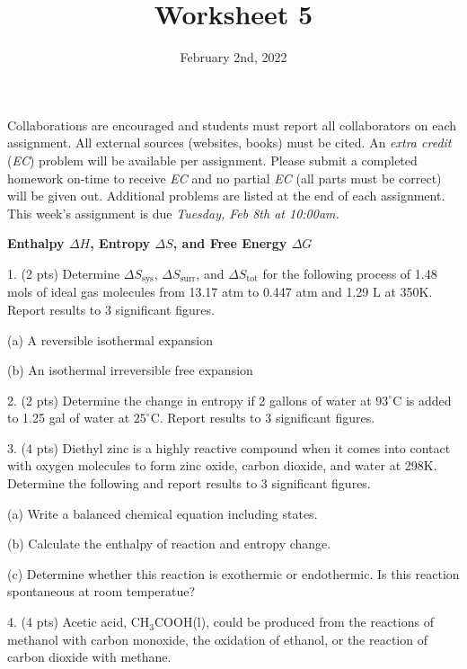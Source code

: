 \documentclass[11pt]{article}
\title{\textbf{Worksheet 5}}
\date{\vspace{-2em}February 2nd, 2022}
\begin{document}
\maketitle

Collaborations are encouraged and students must report all collaborators
on each assignment. All external sources (websites, books) must be
cited. An \textit{extra credit} (\textit{EC}) problem will be available per
assignment. Please submit a completed homework on-time to receive \textit{EC}
and no partial \textit{EC} (all parts must be correct) will be given out.
Additional problems are listed at the end of each assignment. This week's
assignment is due \textit{Tuesday, Feb 8th at 10:00am.}

\textbf{Enthalpy $\Delta H$, Entropy $\Delta S$, and Free Energy $\Delta G$}

1. (2 pts) Determine $\Delta S_\text{sys}$, $\Delta S_\text{surr}$, and $\Delta S_\text{tot}$ for the
following process of 1.48 mols of ideal gas molecules from 13.17 atm to 0.447 atm
and 1.29 L at 350K. Report results to 3 significant figures.

(a) A reversible isothermal expansion

(b) An isothermal irreversible free expansion

\vspace{2.5in}

2. (2 pts) Determine the change in entropy if 2 gallons of water at $93^\circ\text{C}$ is added to
1.25 gal of water at $25^\circ\text{C}$. Report results to 3 significant figures.

\vspace{2.5in}

3. (4 pts) Diethyl zinc is a highly reactive compound when it comes into contact with oxygen molecules
to form zinc oxide, carbon dioxide, and water at 298K. Determine the following and report results
to 3 significant figures.

(a) Write a balanced chemical equation including states.

(b) Calculate the enthalpy of reaction and entropy change.

(c) Determine whether this reaction is exothermic or endothermic. Is this reaction spontaneous
at room temperatue?

\vspace{2.5in}

4. (4 pts) Acetic acid, CH$_3$COOH(l), could be produced from the reactions of methanol with carbon monoxide,
the oxidation of ethanol, or the reaction of carbon dioxide with methane.
\end{document}
